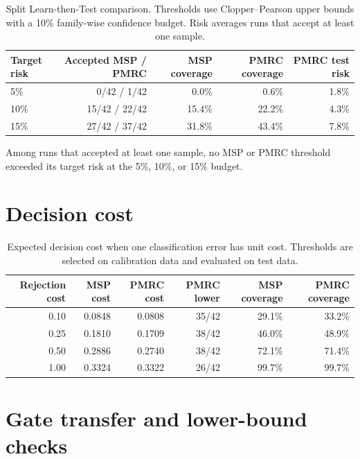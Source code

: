 \documentclass[11pt,a4paper]{article}
\begin{document}
\begin{table}[H]
\centering
\caption{Split Learn-then-Test comparison. Thresholds use Clopper--Pearson upper bounds with a 10\% family-wise confidence budget. Risk averages runs that accept at least one sample.}
\label{tab:ltt}
\small
\begin{tabular}{@{}lrrrr@{}}
\toprule
Target risk & Accepted MSP / PMRC & MSP coverage & PMRC coverage & PMRC test risk \\
\midrule
5\% & 0/42 / 1/42 & 0.0\% & 0.6\% & 1.8\% \\
10\% & 15/42 / 22/42 & 15.4\% & 22.2\% & 4.3\% \\
15\% & 27/42 / 37/42 & 31.8\% & 43.4\% & 7.8\% \\
\bottomrule
\end{tabular}
\end{table}

Among runs that accepted at least one sample, no MSP or PMRC threshold
exceeded its target risk at the 5\%, 10\%, or 15\% budget.

\section{Decision cost}

\begin{table}[H]
\centering
\caption{Expected decision cost when one classification error has unit cost. Thresholds are selected on calibration data and evaluated on test data.}
\label{tab:decision-cost}
\small
\begin{tabular}{@{}rrrrrr@{}}
\toprule
Rejection cost & MSP cost & PMRC cost & PMRC lower & MSP coverage & PMRC coverage \\
\midrule
0.10 & 0.0848 & 0.0808 & 35/42 & 29.1\% & 33.2\% \\
0.25 & 0.1810 & 0.1709 & 38/42 & 46.0\% & 48.9\% \\
0.50 & 0.2886 & 0.2740 & 38/42 & 72.1\% & 71.4\% \\
1.00 & 0.3324 & 0.3322 & 26/42 & 99.7\% & 99.7\% \\
\bottomrule
\end{tabular}
\end{table}

\section{Gate transfer and lower-bound checks}
\end{document}
